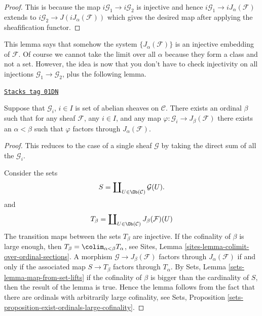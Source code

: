 \begin{proof}
This is because the map $i\mathcal{G}_1 \to i\mathcal{G}_2$ is injective
and hence $i\mathcal{G}_1 \to iJ_\alpha(\mathcal{F})$ extends to
$i\mathcal{G}_2 \to J(iJ_\alpha(\mathcal{F}))$ which gives the
desired map after applying the sheafification functor.
\end{proof}

This lemma says that somehow the system $\{J_{\alpha}(\mathcal{F})\}$
is an injective embedding of $\mathcal{F}$. Of course
we cannot take the limit over all $\alpha$ because they form a class
and not a set. However, the idea is now that you don't have to check
injectivity on all injections $\mathcal{G}_1 \to \mathcal{G}_2$, plus
the following lemma.

\begin{lemma}
\label{injectives-lemma-map-into-smaller}
\href{https://stacks.math.columbia.edu/tag/01DN}{\texttt{Stacks tag 01DN}}

Suppose that $\mathcal{G}_i$, $i\in I$ is set of abelian sheaves
on $\mathcal{C}$. There exists an ordinal $\beta$ such that
for any sheaf $\mathcal{F}$, any $i\in I$, and any map
$\varphi : \mathcal{G}_i \to J_\beta(\mathcal{F})$ there exists an
$\alpha < \beta$ such that $ \varphi $ factors through
$J_\alpha(\mathcal{F})$.
\end{lemma}

\begin{proof}
This reduces to the case of a single sheaf $\mathcal{G}$
by taking the direct sum of all the $\mathcal{G}_i$.

\medskip\noindent
Consider the sets
$$
S = \coprod\nolimits_{U \in \Ob(\mathcal{C})} \mathcal{G}(U).
$$
and
$$
T_\beta
=
\coprod\nolimits_{U \in \Ob(\mathcal{C})} J_\beta(\mathcal{F})(U)
$$
The transition maps between the sets $T_\beta$ are injective.
If the cofinality of $\beta$ is large enough, then
$T_\beta = \colim_{\alpha < \beta} T_\alpha$, see
Sites, Lemma \ref{sites-lemma-colimit-over-ordinal-sections}.
A morphism $\mathcal{G} \to J_\beta(\mathcal{F})$ factors
through $J_\alpha(\mathcal{F})$ if and only if
the associated map $S \to T_\beta$ factors through $T_\alpha$.
By
Sets, Lemma \ref{sets-lemma-map-from-set-lifts}
if the cofinality of $\beta$ is bigger than the cardinality
of $S$, then the result of the lemma is true. Hence the lemma
follows from the fact that there are ordinals with arbitrarily
large cofinality, see
Sets, Proposition \ref{sets-proposition-exist-ordinals-large-cofinality}.
\end{proof}

